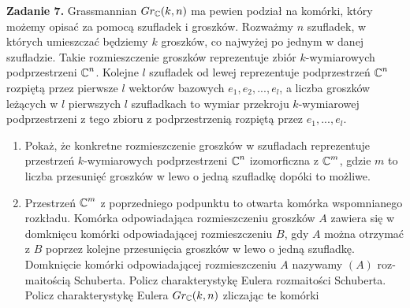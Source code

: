 \textbf{\large\color{orange}Zadanie 7.} Grassmannian $Gr_{\operatorname{\mathbb{C}}}(k, n)$ ma pewien podział na komórki, który możemy opisać za pomocą szufladek i groszków. Rozważmy $n$ szufladek, w których umieszczać będziemy $k$ groszków, co najwyżej po jednym w danej szufladzie. Takie rozmieszczenie groszków reprezentuje zbiór $k$-wymiarowych podprzestrzeni $\operatorname{\mathbb{C}}^n$. Kolejne $l$ szufladek od lewej reprezentuje podprzestrzeń $\operatorname{\mathbb{C}}^n$ rozpiętą przez pierwsze $l$ wektorów bazowych $e_1, e_2,..., e_l$, a liczba groszków leżących w $l$ pierwszych $l$ szufladkach to wymiar przekroju $k$-wymiarowej podprzestrzeni z tego zbioru z podprzestrzenią rozpiętą przez $e_1,..., e_l$.
\begin{enumerate}[label=(\alph*)]
  \item Pokaż, że konkretne rozmieszczenie groszków w szufladach reprezentuje przestrzeń $k$-wymiarowych podprzestrzeni $\operatorname{\mathbb{C}}^n$ izomorficzna z $\operatorname{\mathbb{C}}^m$, gdzie $m$ to liczba przesunięć groszków w lewo o jedną szufladkę dopóki to możliwe.
  \item Przestrzeń $\operatorname{\mathbb{C}}^m$ z poprzedniego podpunktu to otwarta komórka wspomnianego rozkładu. Komórka odpowiadająca rozmieszczeniu groszków $A$ zawiera się w
domknięcu komórki odpowiadającej rozmieszczeniu $B$, gdy $A$ można otrzymać z $B$ poprzez kolejne przesunięcia groszków w lewo o jedną szufladkę.
Domknięcie komórki odpowiadającej rozmieszczeniu $A$ nazywamy $(A)$ roz-
maitością Schuberta. Policz charakterystykę Eulera rozmaitości Schuberta.
Policz charakterystykę Eulera $Gr_{\operatorname{\mathbb{C}}}(k, n)$ zliczając te komórki
\end{enumerate}
